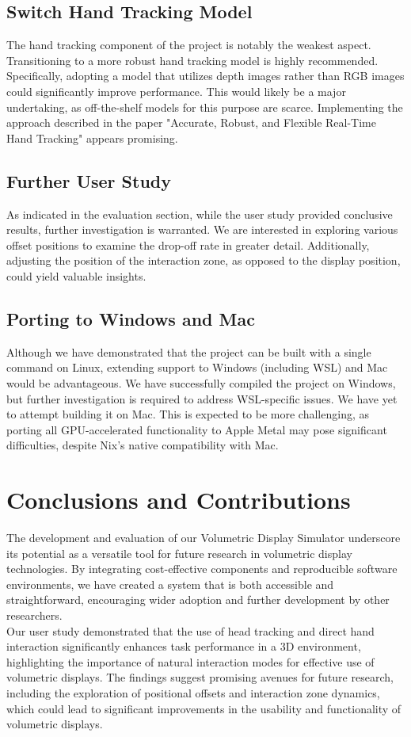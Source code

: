 \subsection{Switch Hand Tracking Model}
The hand tracking component of the project is notably the weakest aspect. Transitioning to a more robust hand tracking model is highly recommended. Specifically, adopting a model that utilizes depth images rather than RGB images could significantly improve performance. This would likely be a major undertaking, as off-the-shelf models for this purpose are scarce. Implementing the approach described in the paper "Accurate, Robust, and Flexible Real-Time Hand Tracking" \cite{sharp2015accurate} appears promising.

\subsection{Further User Study}
As indicated in the evaluation section, while the user study provided conclusive results, further investigation is warranted. We are interested in exploring various offset positions to examine the drop-off rate in greater detail. Additionally, adjusting the position of the interaction zone, as opposed to the display position, could yield valuable insights.

\subsection{Porting to Windows and Mac}
Although we have demonstrated that the project can be built with a single command on Linux, extending support to Windows (including WSL) and Mac would be advantageous. We have successfully compiled the project on Windows, but further investigation is required to address WSL-specific issues. We have yet to attempt building it on Mac. This is expected to be more challenging, as porting all GPU-accelerated functionality to Apple Metal \cite{noauthor_httpsdeveloperapplecommetalmetal-shading-language-specificationpdf_nodate} may pose significant difficulties, despite Nix's native compatibility with Mac.

\section{Conclusions and Contributions}

The development and evaluation of our Volumetric Display Simulator underscore its potential as a versatile tool for future research in volumetric display technologies. By integrating cost-effective components and reproducible software environments, we have created a system that is both accessible and straightforward, encouraging wider adoption and further development by other researchers. \\

Our user study demonstrated that the use of head tracking and direct hand interaction significantly enhances task performance in a 3D environment, highlighting the importance of natural interaction modes for effective use of volumetric displays. The findings suggest promising avenues for future research, including the exploration of positional offsets and interaction zone dynamics, which could lead to significant improvements in the usability and functionality of volumetric displays.